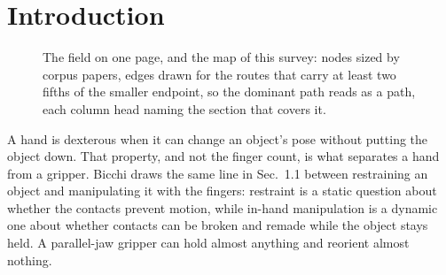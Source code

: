 \section{Introduction}
\label{sec:intro}

\makeatletter
{}
\makeatother

\begin{figure}[!t]
  \centering
  \caption{The field on one page, and the map of this survey: nodes sized by corpus papers, edges
  drawn for the routes that carry at least two fifths of the smaller endpoint, so the dominant
  path reads as a path, each column head naming the section that covers it.}
  \label{fig:field}
\end{figure}

A hand is dexterous when it can change an object's pose without putting the object down. That
property, and not the finger count, is what separates a hand from a gripper. Bicchi
\cite{bicchi_grasping_chapter_2001} draws the same line in Sec.~1.1 between restraining an
object and manipulating it with the fingers: restraint is a static question about whether the
contacts prevent motion, while in-hand manipulation is a dynamic one about whether contacts can
be broken and remade while the object stays held. A parallel-jaw gripper can hold almost
anything and reorient almost nothing.

